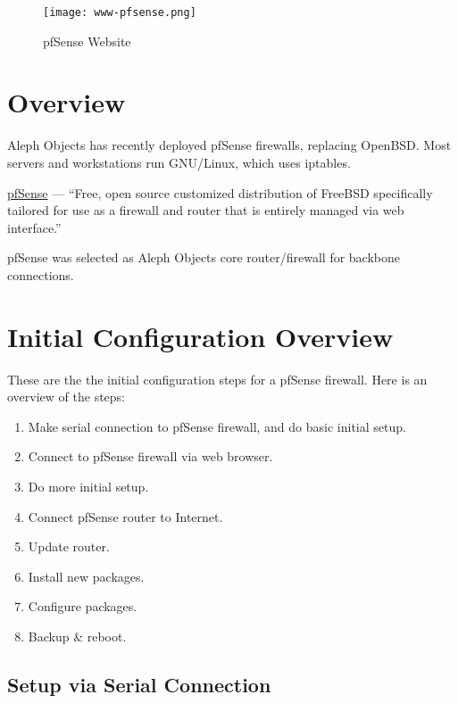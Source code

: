 %
%
%
%
%
\begin{figure}[h!]
\texttt{[image: www-pfsense.png]}
 \caption{pfSense Website}
 \label{fig:www-pfsense}
\end{figure}

\section{Overview}
Aleph Objects has recently deployed pfSense firewalls, replacing OpenBSD.
Most servers and workstations run GNU/Linux, which uses iptables.

\href{https://www.pfsense.org/}{pfSense} --- ``Free, open source customized
distribution of FreeBSD specifically tailored for use as a firewall and router
that is entirely managed via web interface.''

pfSense was selected as Aleph Objects core router/firewall for backbone
connections.

\section{Initial Configuration Overview}

These are the the initial configuration steps for a pfSense firewall. Here is an overview of the steps:

\begin{enumerate}
 \item Make serial connection to pfSense firewall, and do basic initial setup.
 \item Connect to pfSense firewall via web browser.
 \item Do more initial setup.
 \item Connect pfSense router to Internet.
 \item Update router.
 \item Install new packages.
 \item Configure packages.
 \item Backup \& reboot.
\end{enumerate}

\subsection{Setup via Serial Connection}

